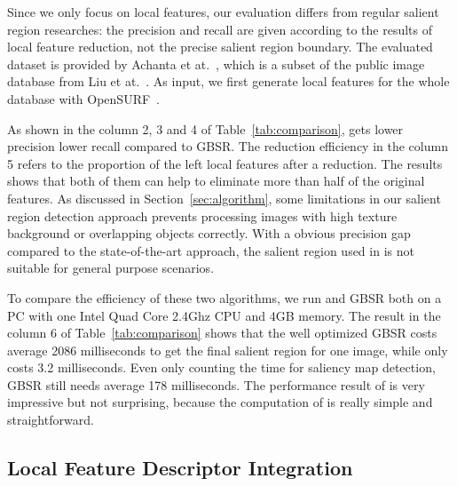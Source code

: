 Since we only focus on local features, our evaluation differs from regular salient region researches: the precision and recall are given according to the results of local feature reduction, not the precise salient region boundary. The evaluated dataset is provided by Achanta et at.~\cite{achanta2009frequency}, which is a subset of the public image database from Liu et at.~\cite{liu2011learning}. As input, we first generate local features for the whole database with OpenSURF~\cite{evans2010opensurf}. 

As shown in the column 2, 3 and 4 of Table~\ref{tab:comparison}, {\sys} gets lower precision lower recall compared to GBSR. The reduction efficiency in the column 5 refers to the proportion of the left local features after a reduction. The results shows that both of them can help to eliminate more than half of the original features. As discussed in Section~\ref{sec:algorithm}, some limitations in our salient region detection approach prevents processing images with high texture background or overlapping objects correctly. With a obvious precision gap compared to the state-of-the-art approach, the salient region used in {\sys} is not suitable for general purpose scenarios.

To compare the efficiency of these two algorithms, we run {\sys} and GBSR both on a PC with one Intel Quad Core 2.4Ghz CPU and 4GB memory. The result in the column 6 of Table~\ref{tab:comparison} shows that the well optimized GBSR costs average 2086 milliseconds to get the final salient region for one image, while {\sys} only costs 3.2 milliseconds. Even only counting the time for saliency map detection, GBSR still needs average 178 milliseconds. The performance result of {\sys} is very impressive but not surprising, because the computation of {\sys} is really simple and straightforward.

\subsection{Local Feature Descriptor Integration}
\label{sec:evaluation_integration}

